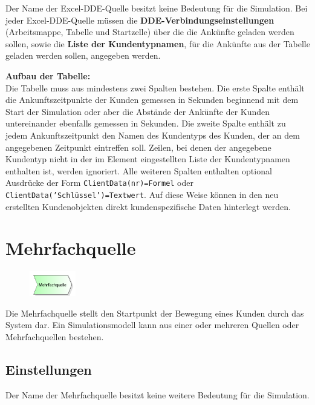 Der Name der Excel-DDE-Quelle besitzt keine Bedeutung für die Simulation.
Bei jeder Excel-DDE-Quelle müssen die \textbf{DDE-Verbindungseinstellungen}
(Arbeitsmappe, Tabelle und Startzelle) über die die Ankünfte geladen werden sollen,
sowie die \textbf{Liste der Kundentypnamen},
für die Ankünfte aus der Tabelle geladen werden sollen, angegeben werden.

\textbf{Aufbau der Tabelle:}~\\
Die Tabelle muss aus mindestens zwei Spalten bestehen. Die erste Spalte enthält die Ankunftszeitpunkte
der Kunden gemessen in Sekunden beginnend mit dem Start der Simulation oder aber die Abstände
der Ankünfte der Kunden untereinander ebenfalls gemessen in Sekunden. Die zweite Spalte
enthält zu jedem Ankunftszeitpunkt den Namen des Kundentyps des Kunden, der an dem
angegebenen Zeitpunkt eintreffen soll. Zeilen, bei denen der angegebene Kundentyp
nicht in der im Element eingestellten Liste der Kundentypnamen enthalten ist, werden ignoriert.
Alle weiteren Spalten enthalten optional Ausdrücke der Form \texttt{ClientData(nr)=Formel}
oder \texttt{ClientData('Schlüssel')=Textwert}.
Auf diese Weise können in den neu erstellten Kundenobjekten direkt kundenspezifische Daten
hinterlegt werden.


\section{Mehrfachquelle}
\label{ref:ModelElementSourceMulti}

\begin{figure}
\vspace{-22pt}
\includegraphics[width=2cm]{imageModelElementSourceMulti.png}
\vspace{-22pt}
\end{figure}

Die Mehrfachquelle stellt den Startpunkt der Bewegung eines Kunden durch das System dar.
Ein Simulationsmodell kann aus einer oder mehreren Quellen oder Mehrfachquellen bestehen.

\subsection*{Einstellungen}

Der Name der Mehrfachquelle besitzt keine weitere Bedeutung für die Simulation.

